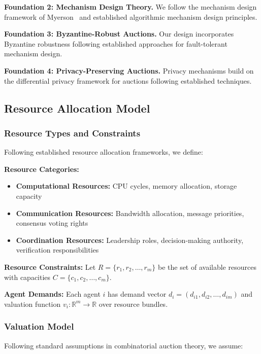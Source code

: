 \documentclass[conference]{IEEEtran}
\begin{document}
\textbf{Foundation 2: Mechanism Design Theory.} We follow the mechanism design framework of Myerson~\cite{myerson1991game} and established algorithmic mechanism design principles.

\textbf{Foundation 3: Byzantine-Robust Auctions.} Our design incorporates Byzantine robustness following established approaches for fault-tolerant mechanism design.

\textbf{Foundation 4: Privacy-Preserving Auctions.} Privacy mechanisms build on the differential privacy framework for auctions following established techniques.

\subsection{Resource Allocation Model}

\subsubsection{Resource Types and Constraints}

Following established resource allocation frameworks, we define:

\textbf{Resource Categories:}
\begin{itemize}
    \item \textbf{Computational Resources:} CPU cycles, memory allocation, storage capacity
    \item \textbf{Communication Resources:} Bandwidth allocation, message priorities, consensus voting rights
    \item \textbf{Coordination Resources:} Leadership roles, decision-making authority, verification responsibilities
\end{itemize}

\textbf{Resource Constraints:} Let $R = \{r_1, r_2, \ldots, r_m\}$ be the set of available resources with capacities $C = \{c_1, c_2, \ldots, c_m\}$.

\textbf{Agent Demands:} Each agent $i$ has demand vector $d_i = (d_{i1}, d_{i2}, \ldots, d_{im})$ and valuation function $v_i: \mathbb{R}^m \rightarrow \mathbb{R}$ over resource bundles.

\subsubsection{Valuation Model}

Following standard assumptions in combinatorial auction theory, we assume:
\end{document}
